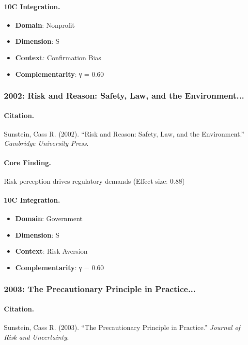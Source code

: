 \paragraph{10C Integration.}
\begin{itemize}[nosep]
  \item \textbf{Domain}: Nonprofit
  \item \textbf{Dimension}: S
  \item \textbf{Context}: Confirmation Bias
  \item \textbf{Complementarity}: γ = 0.60
\end{itemize}

\subsubsection{2002: Risk and Reason: Safety, Law, and the Environment...}

\paragraph{Citation.}
Sunstein, Cass R. (2002). ``Risk and Reason: Safety, Law, and the Environment.''
\textit{Cambridge University Press}.

\paragraph{Core Finding.}
Risk perception drives regulatory demands (Effect size: 0.88)

\paragraph{10C Integration.}
\begin{itemize}[nosep]
  \item \textbf{Domain}: Government
  \item \textbf{Dimension}: S
  \item \textbf{Context}: Risk Aversion
  \item \textbf{Complementarity}: γ = 0.60
\end{itemize}

\subsubsection{2003: The Precautionary Principle in Practice...}

\paragraph{Citation.}
Sunstein, Cass R. (2003). ``The Precautionary Principle in Practice.''
\textit{Journal of Risk and Uncertainty}.

